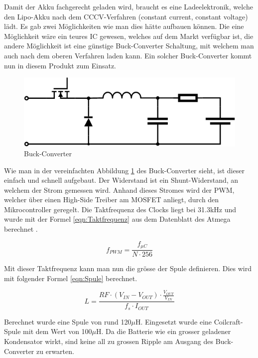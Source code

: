 Damit der Akku fachgerecht geladen wird, braucht es eine Ladeelektronik, welche den Lipo-Akku nach dem CCCV-Verfahren (constant current, constant voltage) lädt. Es gab zwei Möglichkeiten wie man dies hätte aufbauen können. Die eine Möglichkeit wäre ein teures IC gewesen, welches auf dem Markt verfügbar ist, die andere Möglichkeit ist eine günstige Buck-Converter Schaltung, mit welchem man auch nach dem oberen Verfahren laden kann. Ein solcher Buck-Converter kommt nun in diesem Produkt zum Einsatz.

\begin{figure} [H]
	\centering
	\includegraphics[width=0.6\linewidth]{images/Buck_Converter}
	\caption{Buck-Converter}
	\label{fig:Buck_Converter}
\end{figure}

Wie man in der vereinfachten Abbildung \ref{fig:Buck_Converter} des Buck-Converter sieht, ist dieser einfach und schnell aufgebaut. Der Widerstand ist ein Shunt-Widerstand, an welchem der Strom gemessen wird. Anhand dieses Stromes wird der PWM, welcher über einen High-Side Treiber am MOSFET anliegt, durch den Mikrocontroller geregelt. Die Taktfrequenz des Clocks liegt bei 31.3kHz und wurde mit der Formel \eqref{eqn:Taktfrequenz} aus dem Datenblatt des Atmega berechnet \cite{DatenblattATMEGA}.

\begin{equation}
f_{ PWM }=\frac { { f }_{ \mu C } }{ N\cdot256 } 
\label{eqn:Taktfrequenz}
\end{equation}

Mit dieser Taktfrequenz kann man nun die grösse der Spule definieren. Dies wird mit folgender Formel \eqref{eqn:Spule} berechnet.

\begin{equation}
L=\frac { RF\cdot\left( { V }_{ IN }-{ V }_{ OUT } \right) \cdot\frac { { V }_{ OUT } }{ { V }_{ IN } }  }{ { f }_{ s }\cdot{ I }_{ OUT } }  
\label{eqn:Spule}
\end{equation}

Berechnet wurde eine Spule von rund 120$\mu$H. Eingesetzt wurde eine Coilcraft-Spule mit dem Wert von 100$\mu$H. Da die Batterie wie ein grosser geladener Kondensator wirkt, sind keine all zu grossen Ripple am Ausgang des Buck-Converter zu erwarten.

